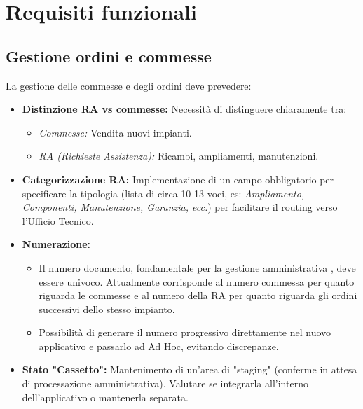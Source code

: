 \documentclass[12pt, a4paper]{article} %
\begin{document}
\section{Requisiti funzionali}

\subsection{Gestione ordini e commesse}
La gestione delle commesse e degli ordini deve prevedere:
\begin{itemize}
      \item \textbf{Distinzione RA vs commesse:} Necessità di distinguere chiaramente tra:
            \begin{itemize}
                  \item \textit{Commesse:} Vendita nuovi impianti.
                  \item \textit{RA (Richieste Assistenza):} Ricambi, ampliamenti, manutenzioni.
            \end{itemize}
      \item \textbf{Categorizzazione RA:} Implementazione di un campo obbligatorio per specificare la tipologia (lista di circa 10-13 voci, es: \textit{Ampliamento, Componenti, Manutenzione, Garanzia, ecc.}) per facilitare il routing verso l'Ufficio Tecnico.
      \item \textbf{Numerazione:}
            \begin{itemize}
                  \item Il numero documento, fondamentale per la gestione amministrativa , deve essere
                        univoco. Attualmente corrisponde al numero commessa per quanto riguarda le
                        commesse e al numero della RA per quanto riguarda gli ordini successivi dello
                        stesso impianto.
                  \item Possibilità di generare il numero progressivo direttamente nel nuovo
                        applicativo e passarlo ad Ad Hoc, evitando discrepanze.
            \end{itemize}
      \item \textbf{Stato "Cassetto":} Mantenimento di un'area di "staging" (conferme in attesa di processazione amministrativa). Valutare se integrarla all'interno dell'applicativo o mantenerla separata.
\end{itemize}
\end{document}

